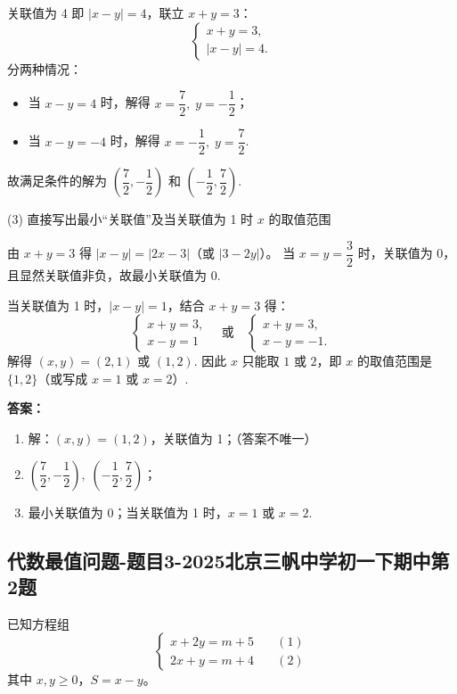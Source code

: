 关联值为 4 即 \(|x-y|=4\)，联立 \(x+y=3\)：
\[
\begin{cases}
x+y=3,\\
|x-y|=4.
\end{cases}
\]
分两种情况：
\begin{itemize}
\item 当 \(x-y=4\) 时，解得 \(x=\dfrac{7}{2},\;y=-\dfrac{1}{2}\)；
\item 当 \(x-y=-4\) 时，解得 \(x=-\dfrac{1}{2},\;y=\dfrac{7}{2}\).
\end{itemize}
故满足条件的解为 \(\left(\dfrac{7}{2},-\dfrac{1}{2}\right)\) 和 \(\left(-\dfrac{1}{2},\dfrac{7}{2}\right)\).

(3) 直接写出最小“关联值”及当关联值为 1 时 \(x\) 的取值范围

由 \(x+y=3\) 得 \(|x-y|=|2x-3|\)（或 \(|3-2y|\)）。  
当 \(x=y=\dfrac{3}{2}\) 时，关联值为 0，且显然关联值非负，故最小关联值为 \(\boxed{0}\).

当关联值为 1 时，\(|x-y|=1\)，结合 \(x+y=3\) 得：
\[
\begin{cases}
x+y=3,\\
x-y=1
\end{cases}
\quad\text{或}\quad
\begin{cases}
x+y=3,\\
x-y=-1.
\end{cases}
\]
解得 \((x,y)=(2,1)\) 或 \((1,2)\).  
因此 \(x\) 只能取 \(1\) 或 \(2\)，即 \(x\) 的取值范围是 \(\{1,2\}\)（或写成 \(x=1\) 或 \(x=2\)）.

\vspace{2mm}
\noindent\textbf{答案：}
\begin{enumerate}
\item 解：\((x,y)=(1,2)\)，关联值为 1；（答案不唯一）
\item \(\left(\dfrac{7}{2},-\dfrac{1}{2}\right),\;\left(-\dfrac{1}{2},\dfrac{7}{2}\right)\)；
\item 最小关联值为 0；当关联值为 1 时，\(x=1\) 或 \(x=2\).
\end{enumerate}

\subsection{代数最值问题-题目3-2025北京三帆中学初一下期中第2题}

\label{代数最值问题-题目3-2025北京三帆中学初一下期中第2题}  


已知方程组
\[
\begin{cases}
x + 2y = m + 5 \quad &(1)\\
2x + y = m + 4 \quad &(2)
\end{cases}
\]
其中 \(x, y \geq 0\)，\(S = x - y\)。

